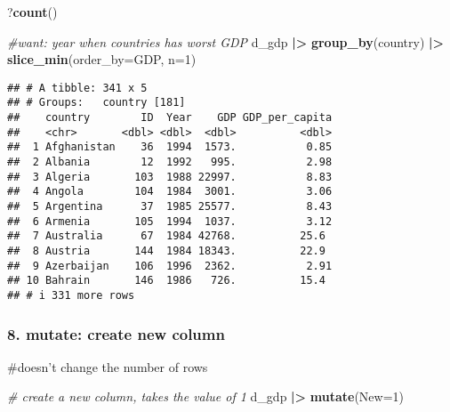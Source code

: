 \documentclass[
]{article}
\newenvironment{Shaded}{\begin{snugshade}}{\end{snugshade}}
\newcommand{\AttributeTok}[1]{\textcolor[rgb]{0.13,0.29,0.53}{#1}}
\newcommand{\CommentTok}[1]{\textcolor[rgb]{0.56,0.35,0.01}{\textit{#1}}}
\newcommand{\DecValTok}[1]{\textcolor[rgb]{0.00,0.00,0.81}{#1}}
\newcommand{\FunctionTok}[1]{\textcolor[rgb]{0.13,0.29,0.53}{\textbf{#1}}}
\newcommand{\NormalTok}[1]{#1}
\newcommand{\SpecialCharTok}[1]{\textcolor[rgb]{0.81,0.36,0.00}{\textbf{#1}}}
\begin{document}
\begin{Shaded}
\begin{Highlighting}[]
\NormalTok{?}\FunctionTok{count}\NormalTok{()}
\end{Highlighting}
\end{Shaded}

\begin{Shaded}
\begin{Highlighting}[]
\CommentTok{\#want: year when countries has worst GDP}
\NormalTok{d\_gdp }\SpecialCharTok{|\textgreater{}}
  \FunctionTok{group\_by}\NormalTok{(country) }\SpecialCharTok{|\textgreater{}}
  \FunctionTok{slice\_min}\NormalTok{(}\AttributeTok{order\_by=}\NormalTok{GDP, }\AttributeTok{n=}\DecValTok{1}\NormalTok{)}
\end{Highlighting}
\end{Shaded}

\begin{verbatim}
## # A tibble: 341 x 5
## # Groups:   country [181]
##    country        ID  Year    GDP GDP_per_capita
##    <chr>       <dbl> <dbl>  <dbl>          <dbl>
##  1 Afghanistan    36  1994  1573.           0.85
##  2 Albania        12  1992   995.           2.98
##  3 Algeria       103  1988 22997.           8.83
##  4 Angola        104  1984  3001.           3.06
##  5 Argentina      37  1985 25577.           8.43
##  6 Armenia       105  1994  1037.           3.12
##  7 Australia      67  1984 42768.          25.6 
##  8 Austria       144  1984 18343.          22.9 
##  9 Azerbaijan    106  1996  2362.           2.91
## 10 Bahrain       146  1986   726.          15.4 
## # i 331 more rows
\end{verbatim}

\hypertarget{mutate-create-new-column}{%
\subsubsection{8. mutate: create new
column}\label{mutate-create-new-column}}

\#doesn't change the number of rows

\begin{Shaded}
\begin{Highlighting}[]
\CommentTok{\# create a new column, takes the value of 1}
\NormalTok{d\_gdp }\SpecialCharTok{|\textgreater{}} \FunctionTok{mutate}\NormalTok{(}\AttributeTok{New=}\DecValTok{1}\NormalTok{)}
\end{Highlighting}
\end{Shaded}
\end{document}

